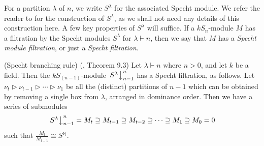 For a partition $\lambda$ of $n$, we write $S^\lambda$ for the associated Specht module. We refer the reader to \cite[Ch. 4]{JAMSN} for
the construction of $S^\lambda$, as we shall not need any details of this construction here. A few key properties of $S^\lambda$ will
suffice. If a $kS_n$-module $M$ has a filtration by the Specht modules $S^\lambda$ for $\lambda \vdash n$, then we say that $M$ has a
\textit{Specht module filtration}, or just a \textit{Specht filtration}.

\begin{theo}\textup{(}Specht branching rule\textup{)}\label{jam_branch_rule_sn:thm}
(\cite{JAMSN}, Theorem 9.3) Let $\lambda \vdash n$ where $n > 0$, and let $k$ be a field. Then the $kS_{(n-1)}$-module
$\left.S^\lambda\right\downarrow^n_{n-1}$ has a Specht filtration, as follows. Let
$\nu_t \triangleright \nu_{t-1} \triangleright \cdots \triangleright \nu_1$ be all the (distinct) partitions of $n-1$ which can be
obtained by removing a single box from $\lambda$, arranged in dominance order. Then we have a series of submodules
\[ \left.S^\lambda\right\downarrow^n_{n-1}  = M_t \supseteq M_{t-1} \supseteq M_{t-2} \supseteq \cdots \supseteq M_1 \supseteq M_0 = 0 \]
such that $\frac{M_l}{M_{l-1}} \cong S^{\nu_l}$.
\end{theo}

